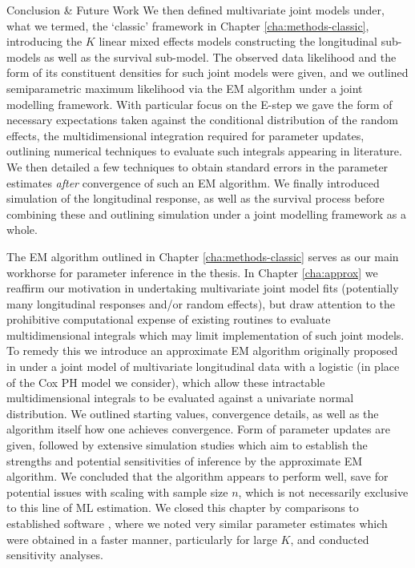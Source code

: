 \begin{chapter}{\label{cha:conclusion}Conclusion \& Future Work}
We then defined multivariate joint models under, what we termed, the `classic' framework in Chapter \ref{cha:methods-classic}, introducing the $K$ linear mixed effects models constructing the longitudinal sub-models as well as the survival sub-model. The observed data likelihood and the form of its constituent densities for such joint models were given, and we outlined semiparametric maximum likelihood via the EM algorithm under a joint modelling framework. With particular focus on the E-step we gave the form of necessary expectations taken against the conditional distribution of the random effects, \ie the multidimensional integration required for parameter updates, outlining numerical techniques to evaluate such integrals appearing in literature. We then detailed a few techniques to obtain standard errors in the parameter estimates \textit{after} convergence of such an EM algorithm. We finally introduced simulation of the longitudinal response, as well as the survival process before combining these and outlining simulation under a joint modelling framework as a whole.

The EM algorithm outlined in Chapter \ref{cha:methods-classic} serves as our main workhorse for parameter inference in the thesis. In Chapter \ref{cha:approx} we reaffirm our motivation in undertaking multivariate joint model fits (\ie potentially many longitudinal responses and/or random effects), but draw attention to the prohibitive computational expense of existing routines to evaluate multidimensional integrals which may limit implementation of such joint models.\newline
To remedy this we introduce an approximate EM algorithm originally proposed in \citet{Bernhardt15} under a joint model of multivariate longitudinal data with a logistic (in place of the Cox PH model we consider), which allow these intractable multidimensional integrals to be evaluated against a univariate normal distribution.\newline
We outlined starting values, convergence details, as well as the algorithm itself \ie how one achieves convergence. Form of parameter updates are given, followed by extensive simulation studies which aim to establish the strengths and potential sensitivities of inference by the approximate EM algorithm. We concluded that the algorithm appears to perform well, save for potential issues with scaling with sample size $n$, which is not necessarily exclusive to this line of ML estimation. We closed this chapter by comparisons to established software \citep{Hickey2018}, where we noted very similar parameter estimates which were obtained in a faster manner, particularly for large $K$, and conducted sensitivity analyses.


\end{chapter}
